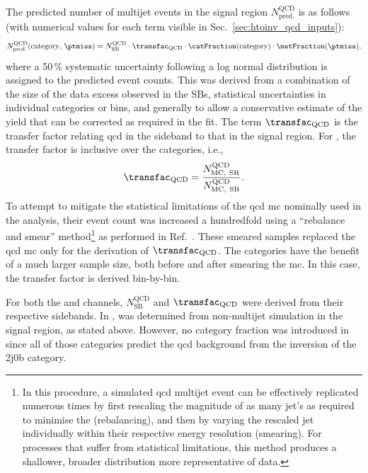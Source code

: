 The predicted number of multijet events in the signal region $N_{\mathrm{pred.}}^{\mathrm{QCD}}$ is as follows (with numerical values for each term visible in Sec.~\ref{sec:htoinv_qcd_inputs}):
\begin{equation}
    N_{\mathrm{pred.}}^{\mathrm{QCD}}(\text{category}, \, \ptmiss) = N_{\mathrm{SB}}^{\mathrm{QCD}} \cdot \transfac_{\mathrm{QCD}} \cdot \catFraction(\text{category}) \cdot \metFraction(\ptmiss),
    \label{eq:qcd_prediction}
\end{equation}
where a 50\,\% systematic uncertainty following a log normal distribution is assigned to the predicted event counts. This was derived from a combination of the size of the data excess observed in the \glspl{SB}, statistical uncertainties in individual categories or \ptmiss bins, and generally to allow a conservative estimate of the yield that can be corrected as required in the fit. The term $\transfac_{\mathrm{QCD}}$ is the transfer factor relating \acrshort{qcd} in the sideband to that in the signal region. For \ttH, the transfer factor is inclusive over the categories, i.e.,
\begin{equation}
    \transfac_{\mathrm{QCD}} = \frac{ N_{\mathrm{MC, \ SR}}^{\mathrm{QCD}} } { N_{\mathrm{MC, \ SB}}^{\mathrm{QCD}} }.
    \label{eq:transfer_factor_qcd}
\end{equation}
To attempt to mitigate the statistical limitations of the \acrshort{qcd} \acrshort{mc} nominally used in the analysis, their event count was increased a hundredfold using a ``rebalance and smear'' method\footnote{In this procedure, a simulated \acrshort{qcd} multijet event can be effectively replicated numerous times by first rescaling the magnitude of as many \gls{jet}'s \ptvec as required to minimise the \mht (rebalancing), and then by varying the rescaled \gls{jet} \pt individually within their respective energy resolution (smearing). For processes that suffer from statistical limitations, this method produces a shallower, broader \ptmiss distribution more representative of data.} as performed in Ref.~. These smeared samples replaced the \acrshort{qcd} \acrshort{mc} only for the derivation of $\transfac_{\mathrm{QCD}}$. The \VH categories have the benefit of a much larger sample size, both before and after smearing the \acrshort{mc}. In this case, the transfer factor is derived bin-by-bin.

For both the \ttH and \VH channels, $N_{\mathrm{SB}}^{\mathrm{QCD}}$ and $\transfac_{\mathrm{QCD}}$ were derived from their respective sidebands. In \ttH, \catFraction was determined from non-multijet simulation in the signal region, as stated above. However, no category fraction was introduced in \VH since all of those categories predict the \acrshort{qcd} background from the inversion of the 2j0b category.
